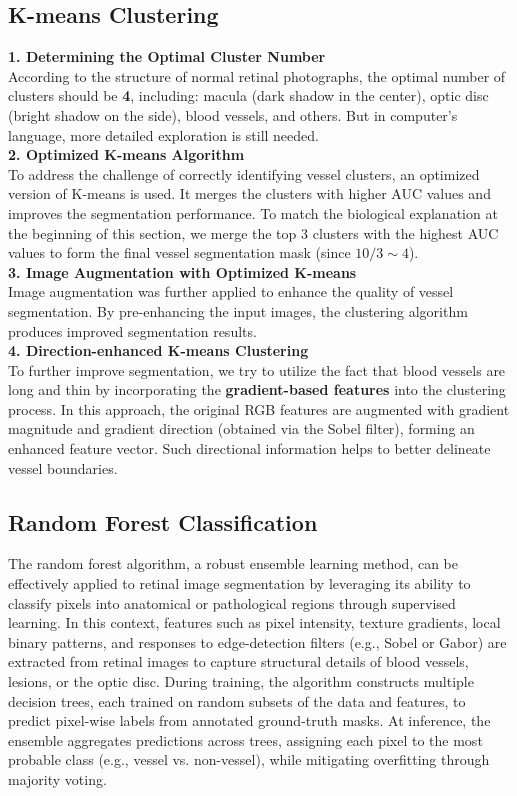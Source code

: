 \documentclass[final]{article}
\begin{document}
\subsection{K-means Clustering}
\textbf{1. Determining the Optimal Cluster Number} \\
According to the structure of normal retinal photographs, the optimal number of clusters should be \textbf{4}, including: macula (dark shadow in the center), optic disc (bright shadow on the side), blood vessels, and others. But in computer's language, more detailed exploration is still needed. \\
\textbf{2. Optimized K-means Algorithm} \\
To address the challenge of correctly identifying vessel clusters, an optimized version of K-means is used. It merges the clusters with higher AUC values and improves the segmentation performance. To match the biological explanation at the beginning of this section, we merge the top 3 clusters with the highest AUC values to form the final vessel segmentation mask (since $10/3 \sim 4$).\\
\textbf{3. Image Augmentation with Optimized K-means} \\
Image augmentation was further applied to enhance the quality of vessel segmentation. By pre-enhancing the input images, the clustering algorithm produces improved segmentation results. \\
\textbf{4. Direction-enhanced K-means Clustering} \\
To further improve segmentation, we try to utilize the fact that blood vessels are long and thin by incorporating the \textbf{gradient-based features} into the clustering process. In this approach, the original RGB features are augmented with gradient magnitude and gradient direction (obtained via the Sobel filter), forming an enhanced feature vector. Such directional information helps to better delineate vessel boundaries.
\subsection{Random Forest Classification}
The random forest algorithm, a robust ensemble learning method, can be effectively applied to retinal image segmentation by leveraging its ability to classify pixels into anatomical or pathological regions through supervised learning. In this context, features such as pixel intensity, texture gradients, local binary patterns, and responses to edge-detection filters (e.g., Sobel or Gabor) are extracted from retinal images to capture structural details of blood vessels, lesions, or the optic disc. During training, the algorithm constructs multiple decision trees, each trained on random subsets of the data and features, to predict pixel-wise labels from annotated ground-truth masks. At inference, the ensemble aggregates predictions across trees, assigning each pixel to the most probable class (e.g., vessel vs. non-vessel), while mitigating overfitting through majority voting. 
\end{document}
